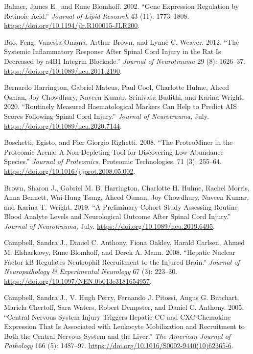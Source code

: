 \documentclass[9pt,lineno]{elife}
\newlength{\cslhangindent}
\newlength{\cslentryspacingunit} %
\newenvironment{CSLReferences}[2] %
 {%
  \setlength{\parindent}{0pt}
  \ifodd #1
  \let\oldpar\par
  \def\par{\hangindent=\cslhangindent\oldpar}
  \fi
  \setlength{\parskip}{#2\cslentryspacingunit}
 }%
 {}
\begin{document}
\begin{landscape}
\begin{landscape}
\begin{landscape}
\begin{landscape}
\begin{CSLReferences}{1}{0}
\leavevmode{}%
Balmer, James E., and Rune Blomhoff. 2002. {``Gene Expression Regulation by Retinoic Acid.''} \emph{Journal of Lipid Research} 43 (11): 1773--1808. \url{https://doi.org/10.1194/jlr.R100015-JLR200}.

\leavevmode{}%
Bao, Feng, Vanessa Omana, Arthur Brown, and Lynne C. Weaver. 2012. {``The Systemic Inflammatory Response After Spinal Cord Injury in the Rat Is Decreased by {a4B1} Integrin Blockade.''} \emph{Journal of Neurotrauma} 29 (8): 1626--37. \url{https://doi.org/10.1089/neu.2011.2190}.

\leavevmode{}%
Bernardo Harrington, Gabriel Mateus, Paul Cool, Charlotte Hulme, Aheed Osman, Joy Chowdhury, Naveen Kumar, Srinivasa Budithi, and Karina Wright. 2020. {``Routinely Measured Haematological Markers Can Help to Predict {AIS} Scores Following Spinal Cord Injury.''} \emph{Journal of Neurotrauma}, July. \url{https://doi.org/10.1089/neu.2020.7144}.

\leavevmode{}%
Boschetti, Egisto, and Pier Giorgio Righetti. 2008. {``The {ProteoMiner} in the Proteomic Arena: {A} Non-Depleting Tool for Discovering Low-Abundance Species.''} \emph{Journal of Proteomics}, Proteomic {Technologies}, 71 (3): 255--64. \url{https://doi.org/10.1016/j.jprot.2008.05.002}.

\leavevmode{}%
Brown, Sharon J., Gabriel M. B. Harrington, Charlotte H. Hulme, Rachel Morris, Anna Bennett, Wai-Hung Tsang, Aheed Osman, Joy Chowdhury, Naveen Kumar, and Karina T. Wright. 2019. {``A Preliminary Cohort Study Assessing Routine Blood Analyte Levels and Neurological Outcome After Spinal Cord Injury.''} \emph{Journal of Neurotrauma}, July. \url{https://doi.org/10.1089/neu.2019.6495}.

\leavevmode{}%
Campbell, Sandra J., Daniel C. Anthony, Fiona Oakley, Harald Carlsen, Ahmed M. Elsharkawy, Rune Blomhoff, and Derek A. Mann. 2008. {``Hepatic {Nuclear Factor kB Regulates Neutrophil Recruitment} to the {Injured Brain}.''} \emph{Journal of Neuropathology \& Experimental Neurology} 67 (3): 223--30. \url{https://doi.org/10.1097/NEN.0b013e3181654957}.

\leavevmode{}%
Campbell, Sandra J., V. Hugh Perry, Fernando J. Pitossi, Angus G. Butchart, Mariela Chertoff, Sara Waters, Robert Dempster, and Daniel C. Anthony. 2005. {``Central {Nervous System Injury Triggers Hepatic CC} and {CXC Chemokine Expression} That {Is Associated} with {Leukocyte Mobilization} and {Recruitment} to {Both} the {Central Nervous System} and the {Liver}.''} \emph{The American Journal of Pathology} 166 (5): 1487--97. \url{https://doi.org/10.1016/S0002-9440(10)62365-6}.


\end{CSLReferences}
\end{landscape}
\end{landscape}
\end{landscape}
\end{landscape}
\end{document}
